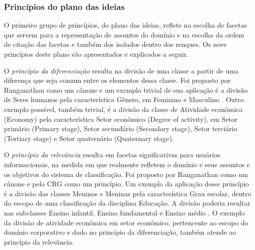 \subsubsection{Princípios do plano das ideias}
\label{planoDasIdeias}

O primeiro grupo de princípios, do plano das ideias, reflete na escolha de facetas que servem para a representação de assuntos do domínio e na escolha da ordem de citação das facetas e também dos isolados dentro dos renques. Os nove princípios deste plano são apresentados e explicados a seguir.


O \emph{princípio da diferenciação} resulta na divisão de uma classe a partir de uma diferença que seja comum entre os elementos dessa classe. Foi proposto por Ranganathan como um cânone e um exemplo trivial de sua aplicação é a divisão de Seres humanos pela característica Gênero, em Feminino e Masculino \cite[p. 66-67]{lima04spiteri}. Outro exemplo possível, também trivial, é a divisão da classe de Atividade econômica (Economy) pela característica Setor econômico (Degree of activity), em Setor primário (Primary stage), Setor secundário (Secondary stage), Setor terciário (Tertiary stage) e Setor quaternário (Quaternary stage).

O \emph{princípio da relevância} resulta em facetas significativas para usuários informacionais, na medida em que realmente refletem o domínio e seus assuntos e os objetivos do sistema de classificação. Foi proposto por Ranganathan como um cânone e pelo CRG como um princípio. Um exemplo da aplicação desse princípio é a divisão das classes Meninos e Meninas pela característica Grau escolar, dentro do escopo de uma classificação da disciplina Educação. A divisão poderia resultar nas subclasses Ensino infantil, Ensino fundamental e Ensino médio \cite[p. 67]{lima04spiteri}. O exemplo da divisão de atividade econômica em setor econômico, pertencente ao escopo do domínio corporativo e dado no princípio da diferenciação, também atende ao princípio da relevância.

